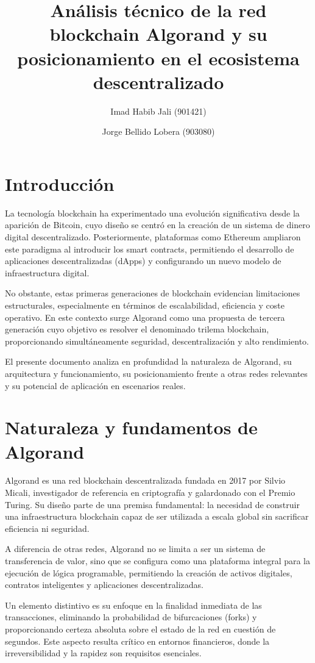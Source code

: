 \documentclass[12pt]{article}
\title{Análisis técnico de la red blockchain Algorand y su posicionamiento en el ecosistema descentralizado}
\author{Imad Habib Jali (901421) \and Jorge Bellido Lobera (903080)}
\date{}
\begin{document}
\maketitle

\section*{Introducción}

La tecnología blockchain ha experimentado una evolución significativa desde la aparición de Bitcoin, cuyo diseño se centró en la creación de un sistema de dinero digital descentralizado. Posteriormente, plataformas como Ethereum ampliaron este paradigma al introducir los smart contracts, permitiendo el desarrollo de aplicaciones descentralizadas (dApps) y configurando un nuevo modelo de infraestructura digital.

No obstante, estas primeras generaciones de blockchain evidencian limitaciones estructurales, especialmente en términos de escalabilidad, eficiencia y coste operativo. En este contexto surge Algorand como una propuesta de tercera generación cuyo objetivo es resolver el denominado trilema blockchain, proporcionando simultáneamente seguridad, descentralización y alto rendimiento.

El presente documento analiza en profundidad la naturaleza de Algorand, su arquitectura y funcionamiento, su posicionamiento frente a otras redes relevantes y su potencial de aplicación en escenarios reales.

\section{Naturaleza y fundamentos de Algorand}

Algorand es una red blockchain descentralizada fundada en 2017 por Silvio Micali, investigador de referencia en criptografía y galardonado con el Premio Turing. Su diseño parte de una premisa fundamental: la necesidad de construir una infraestructura blockchain capaz de ser utilizada a escala global sin sacrificar eficiencia ni seguridad.

A diferencia de otras redes, Algorand no se limita a ser un sistema de transferencia de valor, sino que se configura como una plataforma integral para la ejecución de lógica programable, permitiendo la creación de activos digitales, contratos inteligentes y aplicaciones descentralizadas.

Un elemento distintivo es su enfoque en la finalidad inmediata de las transacciones, eliminando la probabilidad de bifurcaciones (forks) y proporcionando certeza absoluta sobre el estado de la red en cuestión de segundos. Este aspecto resulta crítico en entornos financieros, donde la irreversibilidad y la rapidez son requisitos esenciales.
\end{document}

